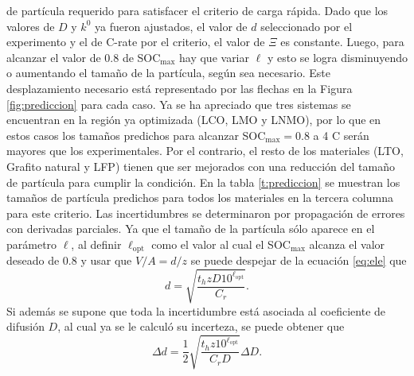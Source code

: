 de partícula requerido para satisfacer el criterio de carga rápida. Dado que los
valores de $D$ y $k^0$ ya fueron ajustados, el valor de $d$ seleccionado por el
experimento y el de C-rate por el criterio, el valor de $\Xi$ es constante. Luego,
para alcanzar el valor de 0.8 de SOC$_{\max}$ hay que variar $\ell$ y esto se
logra disminuyendo o aumentando el tamaño de la partícula, según sea necesario. 
Este desplazamiento necesario está representado por las flechas en la Figura 
\ref{fig:prediccion} para cada caso. Ya se ha apreciado que tres sistemas se 
encuentran en la región ya optimizada (LCO, LMO y LNMO), por lo que en estos casos
los tamaños predichos para alcanzar SOC$_{\max} = 0.8$ a 4 C serán mayores que 
los experimentales. Por el contrario, el resto de los materiales (LTO, Grafito
natural y LFP) tienen que ser mejorados con una reducción del tamaño de partícula
para cumplir la condición. En la tabla \ref{t:prediccion} se muestran los tamaños
de partícula predichos para todos los materiales en la tercera columna para este
criterio. Las incertidumbres se determinaron por propagación de errores con 
derivadas parciales. Ya que el tamaño de la partícula sólo aparece en el parámetro
$\ell$, al definir $\ell_{\text{opt}}$ como el valor al cual el SOC$_{\max}$ 
alcanza el valor deseado de 0.8 y usar que $V/A = d/z$ se puede despejar de la 
ecuación \ref{eq:ele} que
\begin{equation}
    d = \sqrt{\frac{t_h z D 10^{\ell_{\text{opt}}}}{C_r}}.
\end{equation}
Si además se supone que toda la incertidumbre está asociada al coeficiente de 
difusión $D$, al cual ya se le calculó su incerteza, se puede obtener que
\begin{equation}
    \Delta d = \frac{1}{2} \sqrt{\frac{t_h z 10^{\ell_{\text{opt}}}}{C_r D}} \Delta D.
\end{equation}

